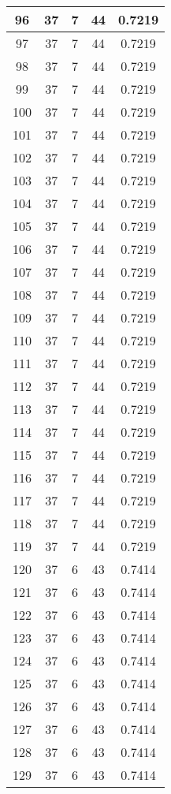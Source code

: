 \documentclass[letterpaper, 12pt]{article}
\begin{document}
\begin{longtable}{|c|c|c|c|c|}
\hline
96 & 37 & 7 & 44 & 0.7219 \\
\hline
97 & 37 & 7 & 44 & 0.7219 \\
\hline
98 & 37 & 7 & 44 & 0.7219 \\
\hline
99 & 37 & 7 & 44 & 0.7219 \\
\hline
100 & 37 & 7 & 44 & 0.7219 \\
\hline
101 & 37 & 7 & 44 & 0.7219 \\
\hline
102 & 37 & 7 & 44 & 0.7219 \\
\hline
103 & 37 & 7 & 44 & 0.7219 \\
\hline
104 & 37 & 7 & 44 & 0.7219 \\
\hline
105 & 37 & 7 & 44 & 0.7219 \\
\hline
106 & 37 & 7 & 44 & 0.7219 \\
\hline
107 & 37 & 7 & 44 & 0.7219 \\
\hline
108 & 37 & 7 & 44 & 0.7219 \\
\hline
109 & 37 & 7 & 44 & 0.7219 \\
\hline
110 & 37 & 7 & 44 & 0.7219 \\
\hline
111 & 37 & 7 & 44 & 0.7219 \\
\hline
112 & 37 & 7 & 44 & 0.7219 \\
\hline
113 & 37 & 7 & 44 & 0.7219 \\
\hline
114 & 37 & 7 & 44 & 0.7219 \\
\hline
115 & 37 & 7 & 44 & 0.7219 \\
\hline
116 & 37 & 7 & 44 & 0.7219 \\
\hline
117 & 37 & 7 & 44 & 0.7219 \\
\hline
118 & 37 & 7 & 44 & 0.7219 \\
\hline
119 & 37 & 7 & 44 & 0.7219 \\
\hline
120 & 37 & 6 & 43 & 0.7414 \\
\hline
121 & 37 & 6 & 43 & 0.7414 \\
\hline
122 & 37 & 6 & 43 & 0.7414 \\
\hline
123 & 37 & 6 & 43 & 0.7414 \\
\hline
124 & 37 & 6 & 43 & 0.7414 \\
\hline
125 & 37 & 6 & 43 & 0.7414 \\
\hline
126 & 37 & 6 & 43 & 0.7414 \\
\hline
127 & 37 & 6 & 43 & 0.7414 \\
\hline
128 & 37 & 6 & 43 & 0.7414 \\
\hline
129 & 37 & 6 & 43 & 0.7414 \\

\end{longtable}
\end{document}

